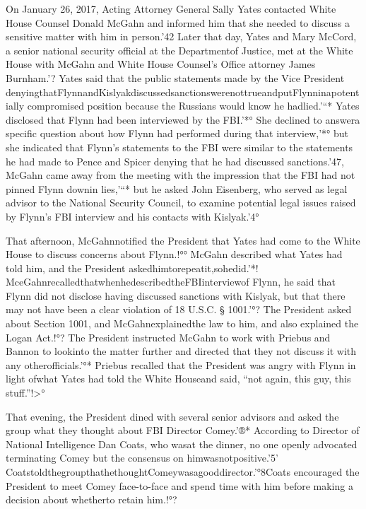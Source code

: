 On January 26, 2017, Acting Attorney General Sally Yates contacted White House Counsel Donald McGahn and informed him that she needed to discuss a sensitive matter with him in person.'42 Later that day, Yates and Mary McCord, a senior national security official at the Departmentof Justice, met at the White House with McGahn and White House Counsel’s Office attorney James Burnham.'? Yates said that the public statements made by the Vice President denyingthatFlynnandKislyakdiscussedsanctionswerenottrueandputFlynninapotentially compromised position because the Russians would know he hadlied.'“* Yates disclosed that Flynn had been interviewed by the FBI.'*° She declined to answera specific question about how Flynn had performed during that interview,'*° but she indicated that Flynn’s statements to the FBI were similar to the statements he had made to Pence and Spicer denying that he had discussed sanctions.'47, McGahn came away from the meeting with the impression that the FBI had not pinned Flynn downin lies,'“* but he asked John Eisenberg, who served as legal advisor to the National Security Council, to examine potential legal issues raised by Flynn’s FBI interview and his contacts with Kislyak.'4°

That afternoon, McGahnnotified the President that Yates had come to the White House to discuss concerns about Flynn.!°° McGahn described what Yates had told him, and the President askedhimtorepeatit,sohedid.'*! MceGahnrecalledthatwhenhedescribedtheFBIinterviewof Flynn, he said that Flynn did not disclose having discussed sanctions with Kislyak, but that there may not have been a clear violation of 18 U.S.C. § 1001.'°? The President asked about Section
1001, and McGahnexplainedthe law to him, and also explained the Logan Act.!°? The President instructed McGahn to work with Priebus and Bannon to lookinto the matter further and directed that they not discuss it with any otherofficials.'°* Priebus recalled that the President was angry with Flynn in light ofwhat Yates had told the White Houseand said, “not again, this guy, this stuff.”!>°

That evening, the President dined with several senior advisors and asked the group what they thought about FBI Director Comey.'®* According to Director of National Intelligence Dan Coats, who wasat the dinner, no one openly advocated terminating Comey but the consensus on himwasnotpositive.'5’ CoatstoldthegroupthathethoughtComeywasagooddirector.'°8Coats encouraged the President to meet Comey face-to-face and spend time with him before making a decision about whetherto retain him.!°?


